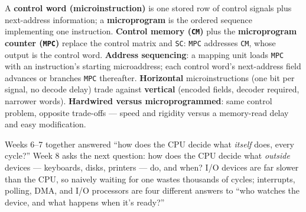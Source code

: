 \documentclass[11pt]{article}
\begin{document}
A \textbf{control word (microinstruction)} is one stored row of control signals plus next-address information; a \textbf{microprogram} is the ordered sequence implementing one instruction. \textbf{Control memory (\texttt{CM})} plus the \textbf{microprogram counter (\texttt{MPC})} replace the control matrix and \texttt{SC}: \texttt{MPC} addresses \texttt{CM}, whose output is the control word. \textbf{Address sequencing}: a mapping unit loads \texttt{MPC} with an instruction's starting microaddress; each control word's next-address field advances or branches \texttt{MPC} thereafter. \textbf{Horizontal} microinstructions (one bit per signal, no decode delay) trade against \textbf{vertical} (encoded fields, decoder required, narrower words). \textbf{Hardwired versus microprogrammed}: same control problem, opposite trade-offs --- speed and rigidity versus a memory-read delay and easy modification.

Weeks 6--7 together answered ``how does the CPU decide what \emph{itself} does, every cycle?'' Week 8 asks the next question: how does the CPU decide what \emph{outside} devices --- keyboards, disks, printers --- do, and when? I/O devices are far slower than the CPU, so naively waiting for one wastes thousands of cycles; interrupts, polling, DMA, and I/O processors are four different answers to ``who watches the device, and what happens when it's ready?''



\end{document}
